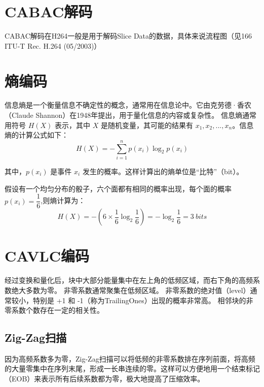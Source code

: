 \documentclass{/Users/hi/Study/template/code}
\begin{document}
\newpage
\section{CABAC解码}
CABAC解码在H264一般是用于解码Slice Data的数据，具体来说流程图（见166 ITU-T Rec. H.264 (05/2003)）


\newpage
\section{熵编码}
\begin{definition}
	信息熵是一个衡量信息不确定性的概念，通常用在信息论中。它由克劳德·香农（Claude Shannon）在1948年提出，用于量化信息的内容或复杂性。
	信息熵通常用符号 \( H(X) \) 表示，其中 \( X \) 是随机变量，其可能的结果有 \( x_1, x_2, ..., x_n \)。信息熵的计算公式如下：
	\begin{equation}
		H( X ) = - \sum_{i=1}^{n} p( x_i  ) \log_2 p( x_i )
	\end{equation}
\end{definition}
其中，\( p(x_i) \) 是事件 \( x_i \) 发生的概率。这样计算出的熵单位是“比特”（bit）。

假设有一个均匀分布的骰子，六个面都有相同的概率出现，每个面的概率 \( p(x_i) = \dfrac{1}{6} \),则熵计算为：
\begin{equation}
	H(X) = -\left(6 \times \frac{1}{6} \log_2 \frac{1}{6}\right) = -\log_2 \frac{1}{6} = 3 ~ bits
\end{equation}






\newpage
\section{CAVLC编码}
经过变换和量化后，块中大部分能量集中在左上角的低频区域，而右下角的高频系数绝大多数为零。
非零系数通常聚集在低频区域。
非零系数的绝对值（level）通常较小，特别是 +1 和 -1（称为TrailingOnes）出现的概率非常高。
相邻块的非零系数个数存在一定的相关性。

\subsection{Zig-Zag扫描}
因为高频系数多为零，Zig-Zag扫描可以将低频的非零系数排在序列前面，将高频的大量零集中在序列末尾，形成一长串连续的零。这样可以方便地用一个结束标记（EOB）来表示所有后续系数都为零，极大地提高了压缩效率。
\end{document}
